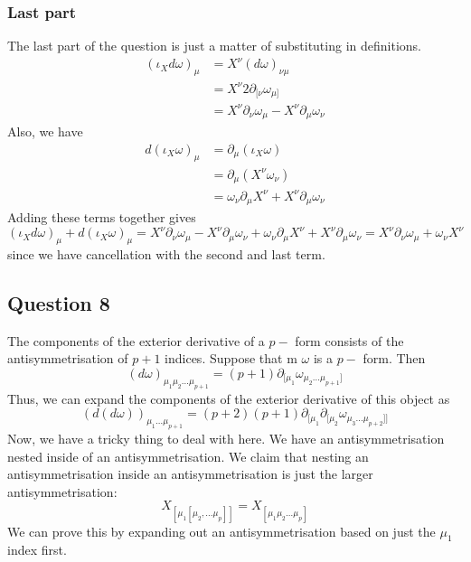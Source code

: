 \documentclass[11pt, a4paper]{article}   	%
\theoremstyle{slplain}
\begin{document}
\subsubsection*{Last part} 
The last part of the question is just a matter of 
substituting in definitions. 
\begin{align*}
	( \iota_X d \omega ) _ \mu &=  X^\nu ( d \omega) _{ \nu\mu } \\
				   &=  X ^ \nu 2 \partial  _{ [ \nu } \omega _{ \mu ] } \\
				   &=  X^\nu \partial  _\nu \omega_{ \mu } - X ^ \nu \partial  _{ \mu } \omega _{ \nu } 
\end{align*}
Also, we have 
\begin{align*}
	d ( \iota _{ X  } \omega) _{ \mu }  &=  \partial  _\mu ( \iota _ X \omega )  \\
					    & =  \partial _ \mu ( X^\nu \omega_\nu) \\
					    &=  \omega_ \nu \partial  _{ \mu } X ^ \nu + X ^ \nu \partial _ \mu \omega _ \nu 
\end{align*}
Adding these terms together gives 
\[
 ( \iota _ X d \omega ) _ \mu + d ( \iota _ X \omega )_\mu  = X^ \nu \partial  _ \nu \omega _ \mu - X ^ \nu \partial  _ \mu \omega _ \nu + \omega _ \nu \partial  _ \mu X ^ \nu + X ^ \nu \partial  _ \mu \omega _ \nu  = X^ \nu \partial  _ \nu  \omega _ \mu + \omega _ \nu X ^ \nu 
\] since we have cancellation with the second and last term. 



\pagebreak 

\subsection{Question 8} 
The components of the exterior derivative of a $ p-$ form consists of the antisymmetrisation of 
$ p + 1 $ indices. Suppose that m $ \omega $ is a $ p- $ form. Then 
\[
( d\omega  )_{\mu_{1} \mu_2 \dots \mu_{p + 1 }} = ( p + 1 ) \partial_{[  \mu_1} \omega_{ \mu_2 \dots \mu_{ p + 1} ] } 	
\] Thus, we can expand the components of the exterior derivative of this object as 
\[
	( d ( d \omega  ))_{ \mu_1 \dots \mu_{p + 1}} = ( p + 2 )( p + 1) \partial_{ [ \mu_1 } \partial_{ [  \mu_2 } \omega _{\mu_3 \dots \mu_{ p + 2 } ]]  }
\] Now, we have a tricky thing to deal with here. 
We have an antisymmetrisation nested inside of an antisymmetrisation. 
We claim that nesting an antisymmetrisation inside an antisymmetrisation 
is just the larger antisymmetrisation: 
\[
X_{ [ \mu_1 [ \mu_2 , \dots \mu_{ p } ]] } = X_{[ \mu_1 \mu_2 \dots \mu_{ p}]}
\] We can prove this by expanding out an antisymmetrisation based on 
just the $ \mu_1 $ index first. 
\end{document}
